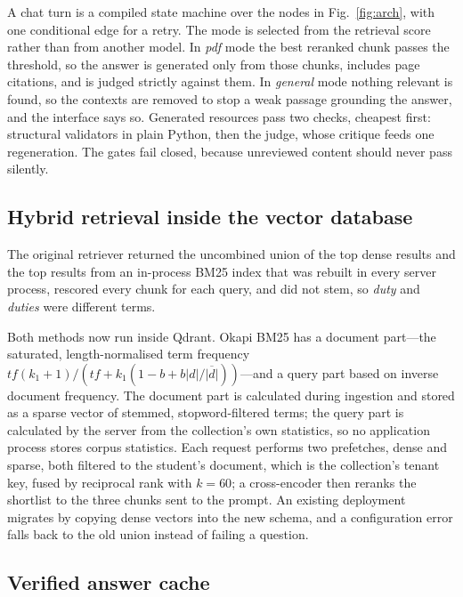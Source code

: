 \documentclass[conference]{IEEEtran}
\begin{document}
A chat turn is a compiled state machine over the nodes in Fig.~\ref{fig:arch}, with one conditional edge for
a retry. The mode is selected from the retrieval score rather than from another model. In \emph{pdf} mode the
best reranked chunk passes the threshold, so the answer is generated only from those chunks, includes page
citations, and is judged strictly against them. In \emph{general} mode nothing relevant is found, so the
contexts are removed to stop a weak passage grounding the answer, and the interface says so. Generated
resources pass two checks, cheapest first: structural validators in plain Python, then the judge, whose
critique feeds one regeneration. The gates fail closed, because unreviewed content should never pass
silently.

\subsection{Hybrid retrieval inside the vector database}
\label{sec:retrieval}

The original retriever returned the uncombined union of the top dense results and the top results from an
in-process BM25 index that was rebuilt in every server process, rescored every chunk for each query, and
did not stem, so \emph{duty} and \emph{duties} were different terms.

Both methods now run inside Qdrant. Okapi BM25 \cite{robertson2009bm25} has a document part---the
saturated, length-normalised term frequency
$tf(k_1{+}1)/(tf+k_1(1-b+b|d|/\overline{|d|}))$---and a query part based on inverse document frequency.
The document part is calculated during ingestion and stored as a sparse vector of stemmed,
stopword-filtered terms; the query part is calculated by the server from the collection's own
statistics, so no application process stores corpus statistics. Each request performs two prefetches,
dense and sparse, both filtered to the student's document, which is the collection's tenant key, fused
by reciprocal rank \cite{cormack2009rrf} with $k{=}60$; a cross-encoder then reranks the shortlist to the
three chunks sent to the prompt. An existing deployment migrates by copying dense vectors into the new
schema, and a configuration error falls back to the old union instead of failing a question.

\subsection{Verified answer cache}
\label{sec:cache}
\end{document}
